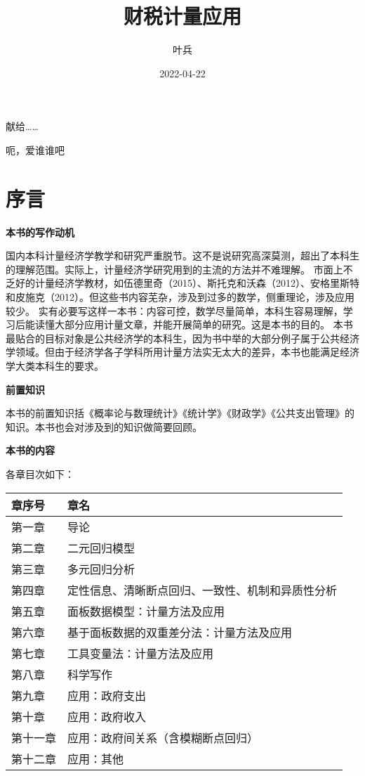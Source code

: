 \documentclass[]{ctexbook}
\title{财税计量应用}
\author{叶兵}
\date{2022-04-22}
\begin{document}
\maketitle


\thispagestyle{empty}

\begin{center}
献给……

呃，爱谁谁吧
\end{center}

\setlength{\abovedisplayskip}{-5pt}
\setlength{\abovedisplayshortskip}{-5pt}

{
\setcounter{tocdepth}{2}
\tableofcontents
}
\listoftables
\listoffigures
\hypertarget{ux5e8fux8a00}{%
\chapter*{序言}\label{ux5e8fux8a00}}


\textbf{本书的写作动机}

国内本科计量经济学教学和研究严重脱节。这不是说研究高深莫测，超出了本科生的理解范围。实际上，计量经济学研究用到的主流的方法并不难理解。
市面上不乏好的计量经济学教材，如伍德里奇（2015）、斯托克和沃森（2012）、安格里斯特和皮施克（2012）。但这些书内容芜杂，涉及到过多的数学，侧重理论，涉及应用较少。
实有必要写这样一本书：内容可控，数学尽量简单，本科生容易理解，学习后能读懂大部分应用计量文章，并能开展简单的研究。这是本书的目的。
本书最贴合的目标对象是公共经济学的本科生，因为书中举的大部分例子属于公共经济学领域。但由于经济学各子学科所用计量方法实无太大的差异，本书也能满足经济学大类本科生的要求。

\textbf{前置知识}

本书的前置知识括《概率论与数理统计》《统计学》《财政学》《公共支出管理》的知识。本书也会对涉及到的知识做简要回顾。

\textbf{本书的内容}

各章目次如下：

\begin{longtable}[]{@{}ll@{}}
\toprule
章序号 & 章名 \\
\midrule
\endhead
第一章 & 导论 \\
第二章 & 二元回归模型 \\
第三章 & 多元回归分析 \\
第四章 & 定性信息、清晰断点回归、一致性、机制和异质性分析 \\
第五章 & 面板数据模型：计量方法及应用 \\
第六章 & 基于面板数据的双重差分法：计量方法及应用 \\
第七章 & 工具变量法：计量方法及应用 \\
第八章 & 科学写作 \\
第九章 & 应用：政府支出 \\
第十章 & 应用：政府收入 \\
第十一章 & 应用：政府间关系（含模糊断点回归） \\
第十二章 & 应用：其他 \\
\bottomrule
\end{longtable}
\end{document}
